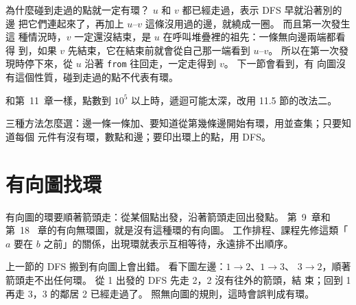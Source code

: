 為什麼碰到走過的點就一定有環？ $u$ 和 $v$ 都已經走過，表示 DFS 早就沿著別的邊
把它們連起來了，再加上 $u$--$v$ 這條沒用過的邊，就繞成一圈。 而且第一次發生這
種情況時，$v$ 一定還沒結束，是 $u$ 在呼叫堆疊裡的祖先：一條無向邊兩端都看得
到，如果 $v$ 先結束，它在結束前就會從自己那一端看到 $u$--$v$。 所以在第一次發
現時停下來，從 $u$ 沿著 \texttt{from} 往回走，一定走得到 $v$。 下一節會看到，有
向圖沒有這個性質，碰到走過的點不代表有環。

和第~11~章一樣，點數到 $10^5$ 以上時，遞迴可能太深，改用 11.5 節的改法二。

三種方法怎麼選：邊一條一條加、要知道從第幾條邊開始有環，用並查集；只要知道每個
元件有沒有環，數點和邊；要印出環上的點，用 DFS。

\section{有向圖找環}
\label{sec:cycle-directed}

有向圖的環要順著箭頭走：從某個點出發，沿著箭頭走回出發點。 第~9~章和第~18~
章的有向無環圖，就是沒有這種環的有向圖。 工作排程、課程先修這類「$a$ 要在 $b$
之前」的關係，出現環就表示互相等待，永遠排不出順序。

上一節的 DFS 搬到有向圖上會出錯。 看下圖左邊：$1 \to 2$、$1 \to 3$、
$3 \to 2$，順著箭頭走不出任何環。 從 1 出發的 DFS 先走 2，2 沒有往外的箭頭，結
束；回到 1 再走 3，3 的鄰居 2 已經走過了。 照無向圖的規則，這時會誤判成有環。

\begin{center}
\label{fig:directed-cycle}
\end{center}

